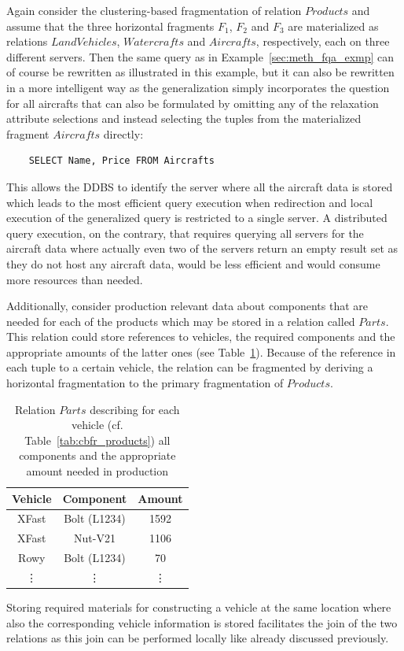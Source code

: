 \begin{exmp}
\label{sec:meth_fqa_exmp2}
Again consider the clustering-based fragmentation of relation $Products$ and assume that the three horizontal fragments $F_1$, $F_2$ and $F_3$ are
materialized as relations $LandVehicles$, $Watercrafts$ and $Aircrafts$, respectively, each on three different servers. Then the same query as in
Example~\ref{sec:meth_fqa_exmp} can of course be rewritten as illustrated in this example, but it can also be rewritten in a more intelligent way as the
generalization simply incorporates the question for all aircrafts that can also be formulated by omitting any of the relaxation attribute selections and
instead selecting the tuples from the materialized fragment $Aircrafts$ directly:
\begin{verbatim}
    SELECT Name, Price FROM Aircrafts
\end{verbatim}
This allows the DDBS to identify the server where all the aircraft data is stored which leads to the most efficient query execution when redirection 
and local execution of the generalized query is restricted to a single server. A distributed query execution, on the contrary, that requires querying all
servers for the aircraft data where actually even two of the servers return an empty result set as they do not host any aircraft data, would be less 
efficient and would consume more resources than needed. 

Additionally, consider production relevant data about components that are needed for each of the products which may be stored in a relation 
called $Parts$. This relation could store references to vehicles, the required components and the appropriate amounts of the latter ones (see
Table~\ref{tab:fqa_parts}). Because of the reference in each tuple to a certain vehicle, the relation can be fragmented by deriving a horizontal 
fragmentation to the primary fragmentation of $Products$.

\begin{table}[h]
    \centering
    \begin{tabular}{|c|c|c|}
        \hline
        Vehicle & Component & Amount \\
        \hline
        XFast & Bolt (L1234) & 1592 \\
        XFast & Nut-V21 & 1106 \\
        Rowy & Bolt (L1234) & 70 \\
        \vdots & \vdots & \vdots \\
        \hline
    \end{tabular}
    \caption{Relation $Parts$ describing for each vehicle (cf. Table~\ref{tab:cbfr_products}) all components and the appropriate amount needed in 
                production}
    \label{tab:fqa_parts}
\end{table}

Storing required materials for constructing a vehicle at the same location where also the corresponding vehicle information is stored facilitates the
join of the two relations as this join can be performed locally like already discussed previously.
\end{exmp}
